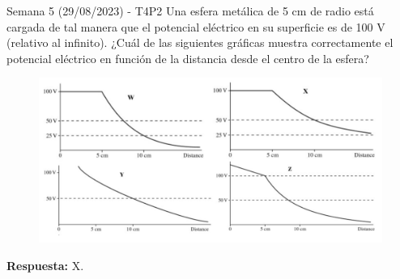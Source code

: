 \begin{frame}{Semana 5 (29/08/2023) - T4P2}
    Una esfera metálica de 5 cm de radio está cargada de tal manera que el potencial el\'ectrico en su superficie es de 100 V (relativo al infinito). ¿Cuál de las siguientes gráficas muestra correctamente el potencial el\'ectrico en función de la distancia desde el centro de la esfera?
    
    \vspace{-2em}
    
    \begin{figure}
        \centering
        \includegraphics[scale=0.3]{figures/T4P2.png}
    \end{figure}
    
    \pause \begin{center}
        \textbf{Respuesta:} X.
    \end{center}
    
\end{frame}



